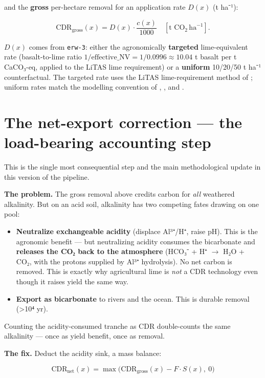 \documentclass[openany]{book}
\providecommand{\tightlist}{%
  \setlength{\itemsep}{0pt}\setlength{\parskip}{0pt}}
\begin{document}
and the \textbf{gross} per-hectare removal for an application rate \(D(x)\) (t
ha⁻¹):

\[
\mathrm{CDR}_{\text{gross}}(x) = D(x)\cdot \frac{c(x)}{1000}\quad[\text{t CO}_2\,\text{ha}^{-1}].
\]

\(D(x)\) comes from \texttt{erw-3}: either the agronomically \textbf{targeted}
lime-equivalent rate (basalt-to-lime ratio
\(1/\text{effective\_NV}=1/0.0996\approx 10.04\) t basalt per t CaCO₃-eq, applied
to the LiTAS lime requirement) or a \textbf{uniform} 10/20/50 t ha⁻¹
counterfactual. The targeted rate uses the LiTAS lime-requirement method of
\citet{aramburu2023}; uniform rates match the modelling convention of
\citet{beerling2020}, \citet{baek2023}, and \citet{kantola2023}.

\chapter{The net-export correction --- the load-bearing accounting step}\label{ch:netexport}

This is the single most consequential step and the main methodological update in
this version of the pipeline.

\textbf{The problem.} The gross removal above credits carbon for \emph{all}
weathered alkalinity. But on an acid soil, alkalinity has two competing fates
drawing on one pool:

\begin{itemize}
\tightlist
\item
  \textbf{Neutralize exchangeable acidity} (displace Al³⁺/H⁺, raise pH). This is
  the agronomic benefit --- but neutralizing acidity consumes the bicarbonate
  and \textbf{releases the CO₂ back to the atmosphere} (HCO₃⁻ + H⁺
  \(\rightarrow\) H₂O + CO₂, with the protons supplied by Al³⁺ hydrolysis). No
  net carbon is removed. This is exactly why agricultural lime is \emph{not} a
  CDR technology even though it raises yield the same way.
\item
  \textbf{Export as bicarbonate} to rivers and the ocean. This is durable
  removal (\textgreater10⁴ yr).
\end{itemize}

Counting the acidity-consumed tranche as CDR double-counts the same alkalinity
--- once as yield benefit, once as removal.

\textbf{The fix.} Deduct the acidity sink, a mass balance:

\[
\boxed{\ \mathrm{CDR}_{\text{net}}(x) = \max\!\big(\mathrm{CDR}_{\text{gross}}(x) - F\cdot S(x),\ 0\big)\ }
\]
\end{document}
